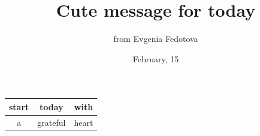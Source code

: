 \documentclass[12pt]{article}
\title{Cute message for today}
\author{from Evgenia Fedotova}
\date{February, 15}
\begin{document}
\maketitle

\begin{tabular}{|| c | c | c ||}
\hline 
start & today & with \\ 
\hline 
a & grateful & heart \\ 
\hline 
\end{tabular} \\ 
 \\ 
\end{document}
